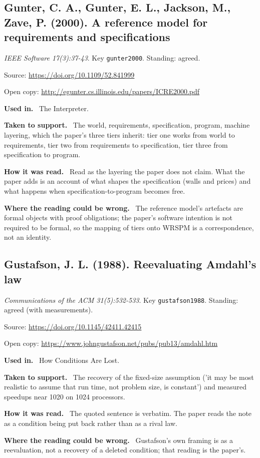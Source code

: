 \documentclass[11pt,oneside]{article}
\newcommand{\field}[1]{\par\noindent\textbf{\color{accent}#1.}\ }
\begin{document}
\hypertarget{src:gunter2000}{}
\subsection*{Gunter, C. A., Gunter, E. L., Jackson, M., Zave, P. (2000). A reference model for requirements and specifications}
\noindent\small\emph{IEEE Software 17(3):37-43}. Key \texttt{gunter2000}. Standing: agreed.
\par\noindent\small Source: \url{https://doi.org/10.1109/52.841999}
\par\noindent\small Open copy: \url{http://egunter.cs.illinois.edu/papers/ICRE2000.pdf}
\normalsize
\field{Used in} The Interpreter.
\field{Taken to support} The world, requirements, specification, program, machine layering, which the paper's three tiers inherit: tier one works from world to requirements, tier two from requirements to specification, tier three from specification to program.
\field{How it was read} Read as the layering the paper does not claim. What the paper adds is an account of what shapes the specification (walls and prices) and what happens when specification-to-program becomes free.
\field{Where the reading could be wrong} The reference model's artefacts are formal objects with proof obligations; the paper's software intention is not required to be formal, so the mapping of tiers onto WRSPM is a correspondence, not an identity.

\hypertarget{src:gustafson1988}{}
\subsection*{Gustafson, J. L. (1988). Reevaluating Amdahl's law}
\noindent\small\emph{Communications of the ACM 31(5):532-533}. Key \texttt{gustafson1988}. Standing: agreed (with measurements).
\par\noindent\small Source: \url{https://doi.org/10.1145/42411.42415}
\par\noindent\small Open copy: \url{https://www.johngustafson.net/pubs/pub13/amdahl.htm}
\normalsize
\field{Used in} How Conditions Are Lost.
\field{Taken to support} The recovery of the fixed-size assumption ('it may be most realistic to assume that run time, not problem size, is constant') and measured speedups near 1020 on 1024 processors.
\field{How it was read} The quoted sentence is verbatim. The paper reads the note as a condition being put back rather than as a rival law.
\field{Where the reading could be wrong} Gustafson's own framing is as a reevaluation, not a recovery of a deleted condition; that reading is the paper's.
\end{document}

